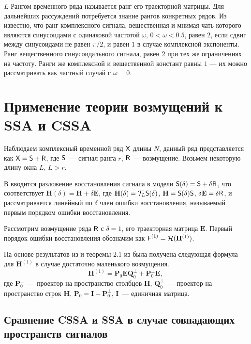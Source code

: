 \documentclass{spisok-article}
\begin{document}
$L$-Рангом временного ряда называется ранг его траекторной матрицы. Для дальнейших рассуждений потребуется знание рангов конкретных рядов.
Из \cite{Golyandina.Stepanov2005} известно, что ранг комплексного сигнала, вещественная и мнимая чать которого являются синусоидами с одинаковой частотой $\omega$, $0<\omega<0.5$, равен $2$, если сдвиг между синусоидами не равен $\pi/2$, и равен $1$ в случае комплексной экспоненты. Ранг вещественного синусоидального сигнала, равен  $2$ при тех же ограничениях на частоту. Ранги же комплексной и вещественной констант равны $1$ --- их можно рассматривать как частный случай с $\omega = 0$.

\section{Применение теории возмущений к SSA и CSSA}

Наблюдаем комплексный временной ряд $\textsf{X}$ длины $N$, данный ряд представляется как $\textsf{X} = \textsf{S} + \textsf{R}$, где $\textsf{S}$~--- сигнал ранга $r$, $\textsf{R}$~--- возмущение.  Возьмем некоторую длину окна $L$, $L>r$.

В \cite{Nekrutkin} вводится разложение восстановления сигнала в модели $\textsf{S}(\delta) = \textsf{S} + \delta \textsf{R}$, что соответствует $\mathbf{H}(\delta) = \mathbf{H} + \delta \mathbf{E}$, где $\mathbf{H}(\delta) = \mathcal{T}_L \textsf{S}(\delta)$, $\mathbf{H} = \textsf{S}(\delta)\textsf{S}$, $\delta\mathbf{E} = \delta \textsf{R}$, и рассматривается линейный по $\delta$ член ошибки восстановления, называемый первым порядком ошибки восстановления.

Рассмотрим возмущение ряда $\textsf{R}$ с $\delta = 1$, его траекторная матрица $\mathbf{E}$. Первый порядок ошибки восстановления обозначим как $\textsf{F}^{(1)} = \mathcal{H}(\mathbf{H}^{(1)})$.

На основе результатов из \cite[стр.12]{Konstantinov} и теоремы 2.1 из \cite{Nekrutkin} была получена следующая формула для $\mathbf{H}^{(1)}$ в случае достаточно маленького возмущения.
\begin{equation} \label{eq:main}
	\mathbf{H}^{(1)} = \mathbf{P}_0 \mathbf{E} \mathbf{Q}^{\perp}_0 + \mathbf{P}^{\perp}_0 \mathbf{E},
\end{equation}
где $\mathbf{P}^{\perp}_0$~--- проектор на пространство столбцов $\mathbf{H}$, $\mathbf{Q}^{\perp}_0$~--- проектор на пространство строк $\mathbf{H}$, $\mathbf{P}_0 = \mathbf{I} - \mathbf{P}^{\perp}_0$, $\mathbf{I}$~--- единичная матрица.

\subsection{Сравнение CSSA и SSA в случае совпадающих пространств сигналов}
\end{document}
